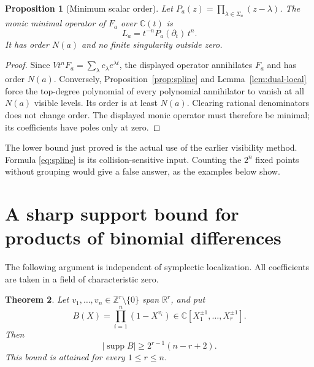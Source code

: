 \documentclass[11pt]{article}
\newtheorem{theorem}{Theorem}[section]
\newtheorem{proposition}[theorem]{Proposition}
\theoremstyle{definition}
\theoremstyle{remark}
\newcommand{\C}{\mathbb C}
\numberwithin{equation}{section}
\begin{document}
\begin{proposition}[Minimum scalar order]\label{prop:min-order}
Let $P_a(z)=\prod_{\lambda\in\Sigma_a}(z-\lambda)$.
The monic minimal operator of $F_a$ over $\C(t)$ is
\begin{equation}\label{eq:min-operator}
 L_a=t^{-n}P_a(\partial_t)\,t^n.
\end{equation}
It has order $N(a)$ and no finite singularity outside zero.
\end{proposition}
\begin{proof}
Since $Vt^nF_a=\sum_\lambda c_\lambda e^{\lambda t}$, the displayed
operator annihilates $F_a$ and has order $N(a)$. Conversely,
Proposition~\ref{prop:spline} and Lemma~\ref{lem:dual-local} force the
top-degree polynomial of every polynomial annihilator to vanish at all
$N(a)$ visible levels. Its order is at least $N(a)$. Clearing rational
denominators does not change order. The displayed monic operator must
therefore be minimal; its coefficients have poles only at zero.
\end{proof}

The lower bound just proved is the actual use of the earlier visibility
method. Formula \eqref{eq:spline} is its collision-sensitive input.
Counting the $2^n$ fixed points without grouping would give a false
answer, as the examples below show.


\section{A sharp support bound for products of binomial differences}
\label{sec:support-rank}

The following argument is independent of symplectic localization. All
coefficients are taken in a field of characteristic zero.

\begin{theorem}\label{thm:binomial-rank}
Let $v_1,\ldots,v_n\in\mathbb Z^r\setminus\{0\}$ span
$\mathbb R^r$, and put
\[
 B(X)=\prod_{i=1}^n(1-X^{v_i})
       \in\mathbb C[X_1^{\pm1},\ldots,X_r^{\pm1}].
\]
Then
\[
 |\operatorname{supp}B|\ge 2^{r-1}(n-r+2).
\]
This bound is attained for every $1\le r\le n$.
\end{theorem}
\end{document}
